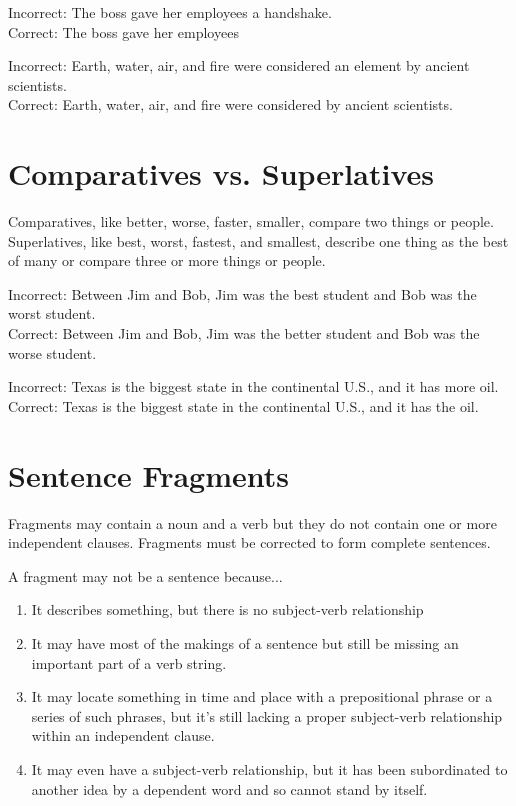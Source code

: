 \documentclass[12pt]{book}
\newcommand{\longline}{\underline{\hspace{2in}} }
\begin{document}
\bigskip
Incorrect:  The boss gave her employees a handshake.\\
Correct:  The boss gave her employees \hrulefill

\bigskip
Incorrect:  Earth, water, air, and fire were considered an element by ancient scientists.\\
Correct:  Earth, water, air, and fire were considered  \longline by ancient scientists.

\section{Comparatives vs. Superlatives}
Comparatives, like better, worse, faster, smaller, compare two things or people.\\
Superlatives, like best, worst, fastest, and smallest, describe one thing as the best of many or compare three or more things or people.

\bigskip
Incorrect:  Between Jim and Bob, Jim was the best student and Bob was the worst student. \\
Correct:  Between Jim and Bob, Jim was the better student and Bob was the worse student.

\bigskip
Incorrect:  Texas is the biggest state in the continental U.S., and it has more oil.
Correct:  Texas is the biggest state in the continental U.S., and it has the \longline oil.

\section{Sentence Fragments}
Fragments may contain a noun and a verb but they do not contain one or more independent clauses. Fragments must be corrected to form complete sentences. 

\bigskip
A fragment may not be a sentence because...
\begin{enumerate}
\item{It describes something, but there is no subject-verb relationship}
\item{It may have most of the makings of a sentence but still be missing an important part of a verb string.}
\item{It may locate something in time and place with a prepositional phrase or a series of such phrases, but it's still lacking a proper subject-verb relationship within an independent clause.}
\item{It may even have a subject-verb relationship, but it has been subordinated to another idea by a dependent word and so cannot stand by itself.}
\end{enumerate}
\end{document}
